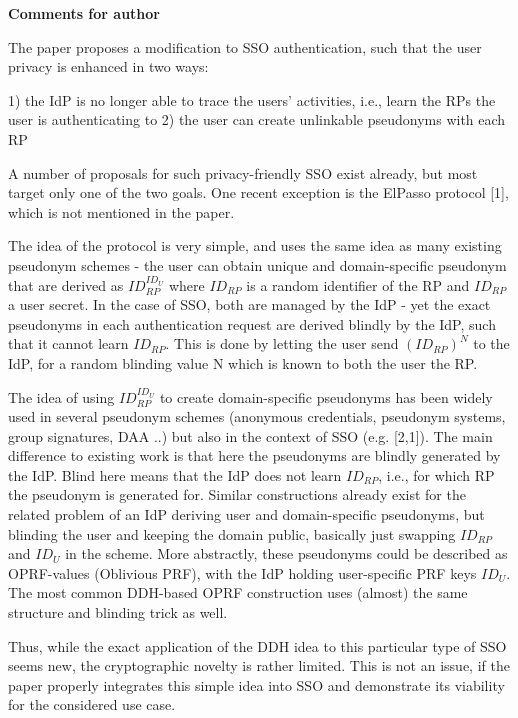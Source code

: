 \documentclass[letterpaper,onecolumn,10pt]{article}
\begin{document}
\vspace{1mm}\noindent\textbf{Comments for author}

The paper proposes a modification to SSO authentication, such that the user privacy is enhanced in two ways:

1) the IdP is no longer able to trace the users' activities, i.e., learn the RPs the user is authenticating to
2) the user can create unlinkable pseudonyms with each RP

A number of proposals for such privacy-friendly SSO exist already, but most target only one of the two goals. One recent exception is the ElPasso protocol [1], which is not mentioned in the paper.

The idea of the protocol is very simple, and uses the same idea as many existing pseudonym schemes - the user can obtain unique and domain-specific pseudonym that are derived as $ID_{RP} ^ {ID_U}$ where $ID_{RP}$ is a random identifier of the RP and $ID_{RP}$ a user secret. In the case of SSO, both are managed by the IdP - yet the exact pseudonyms in each authentication request are derived blindly by the IdP, such that it cannot learn $ID_{RP}$. This is done by letting the user send $(ID_{RP})^N$ to the IdP, for a random blinding value N which is known to both the user the RP.

The idea of using $ID_{RP}^{ID_U}$ to create domain-specific pseudonyms has been widely used in several pseudonym schemes (anonymous credentials, pseudonym systems, group signatures, DAA ..) but also in the context of SSO (e.g. [2,1]). The main difference to existing work is that here the pseudonyms are blindly generated by the IdP. Blind here means that the IdP does not learn $ID_{RP}$, i.e., for which RP the pseudonym is generated for. Similar constructions already exist for the related problem of an IdP deriving user and domain-specific pseudonyms, but blinding the user and keeping the domain public, basically just swapping $ID_{RP}$ and $ID_U$ in the scheme. More abstractly, these pseudonyms could be described as OPRF-values (Oblivious PRF), with the IdP holding user-specific PRF keys $ID_U$. The most common DDH-based OPRF construction uses (almost) the same structure and blinding trick as well.

Thus, while the exact application of the DDH idea to this particular type of SSO seems new, the cryptographic novelty is rather limited. This is not an issue, if the paper properly integrates this simple idea into SSO and demonstrate its viability for the considered use case.
\end{document}
